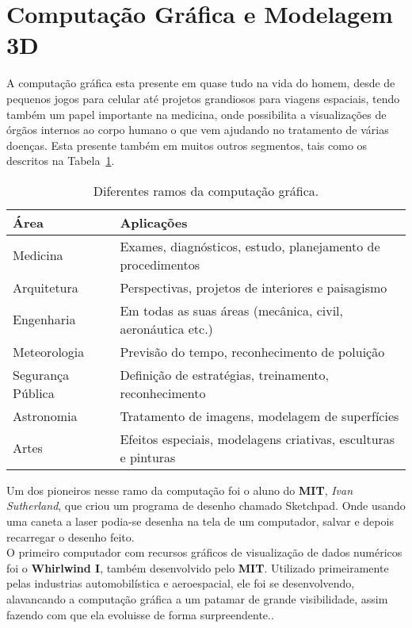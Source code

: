 \section{Computação Gráfica e Modelagem 3D}
A computação gráfica esta presente em quase tudo na vida do homem, desde de pequenos jogos para celular até projetos grandiosos para viagens espaciais, tendo também um papel importante na medicina, onde possibilita a visualizações de órgãos internos ao corpo humano o que vem ajudando no tratamento de várias doenças\cite{comp_grafica_h}\cite{azevedo}\cite{kirne}. Esta presente também em muitos outros segmentos, tais como os descritos na Tabela~\ref{tab:comp_teoria}. \\

\begin{table}
\centering
\begin{tabular}{|l|l|}
	\hline
	Área & Aplicações \\ \hline
	Medicina &  Exames, diagnósticos, estudo, planejamento de procedimentos\\ \hline
	Arquitetura & Perspectivas, projetos de interiores e paisagismo\\ \hline
	Engenharia & Em todas as suas áreas (mecânica, civil, aeronáutica etc.)\\ \hline
	Meteorologia & Previsão do tempo, reconhecimento de poluição\\ \hline
	Segurança Pública & Definição de estratégias, treinamento, reconhecimento\\ \hline
	Astronomia & Tratamento de imagens, modelagem de superfícies\\ \hline
	Artes & Efeitos especiais, modelagens criativas, esculturas e pinturas\\
	\hline
\end{tabular}
\caption{Diferentes ramos da computação gráfica.}
\label{tab:comp_teoria}
\end{table}

Um dos pioneiros nesse ramo da computação foi o aluno do \textbf{MIT}, \textit{Ivan Sutherland}, que criou um programa de desenho chamado Sketchpad\cite{sutherland}. Onde usando uma caneta a laser podia-se desenha na tela de um computador, salvar e depois recarregar o desenho feito.\\

O primeiro computador com recursos gráficos de visualização de dados numéricos foi o \textbf{Whirlwind I}, também desenvolvido pelo \textbf{MIT}. Utilizado primeiramente pelas industrias automobilística e aeroespacial, ele foi se desenvolvendo, alavancando a computação gráfica a um patamar de grande visibilidade, assim fazendo com que ela evoluisse de forma surpreendente.\cite{comp_grafica_h2}.\\

